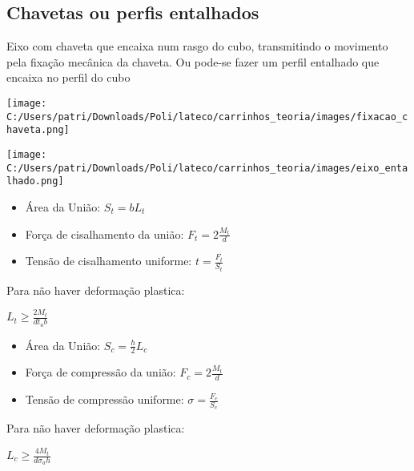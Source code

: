 \subsection{Chavetas ou perfis entalhados}

Eixo com chaveta que encaixa num rasgo do cubo, transmitindo o movimento pela fixação mecânica da chaveta. Ou pode-se fazer um perfil entalhado que encaixa no perfil do cubo

\texttt{[image: C:/Users/patri/Downloads/Poli/lateco/carrinhos\_teoria/images/fixacao\_chaveta.png]}

\texttt{[image: C:/Users/patri/Downloads/Poli/lateco/carrinhos\_teoria/images/eixo\_entalhado.png]}

\begin{namedtheorem} 

\begin{itemize}
	\item Área da União: $S_t = bL_t$
	\item Força de cisalhamento da união: $F_t = 2\frac{M_t}{d}$
	\item Tensão de cisalhamento uniforme: $t = \frac{F_t}{S_t}$
\end{itemize}

Para não haver deformação plastica:

$\boxed{L_t \geq \frac{2M_t}{d t_a b} }$

\end{namedtheorem}

\begin{namedtheorem}

\begin{itemize}
	\item Área da União: $S_c = \frac{h}{2}L_c$
	\item Força de compressão da união: $F_c = 2\frac{M_t}{d}$
	\item Tensão de compressão uniforme: $\sigma = \frac{F_c}{S_c}$
\end{itemize}

Para não haver deformação plastica:

$\boxed{L_c \geq \frac{4M_t}{d \sigma_a h} }$

\end{namedtheorem}

